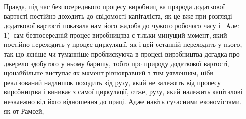 Правда, під час безпосереднього процесу виробництва природа
додаткової вартості постійно доходить до свідомості капіталіста,
як це вже при розгляді додаткової вартості показала
нам його жадоба до чужого робочого часу і~ Але: 1)~сам
безпосередній процес виробництва є тільки минущий момент,
який постійно переходить у процес циркуляції, як і цей останній
переходить у нього, так що ясніше чи туманніше проблискуюча
в процесі виробництва догадка про джерело здобутого у ньому
баришу, тобто про природу додаткової вартості, щонайбільше
виступає як момент рівноправний з тим уявленням, ніби реалізований
надлишок походить від руху, який не залежить від
процесу виробництва і виникає з самої циркуляції, отже, руху,
який належить капіталові незалежно від його відношення до
праці. Адже навіть сучасними економістами, як от Рамсей,
\parbreak{}  %
